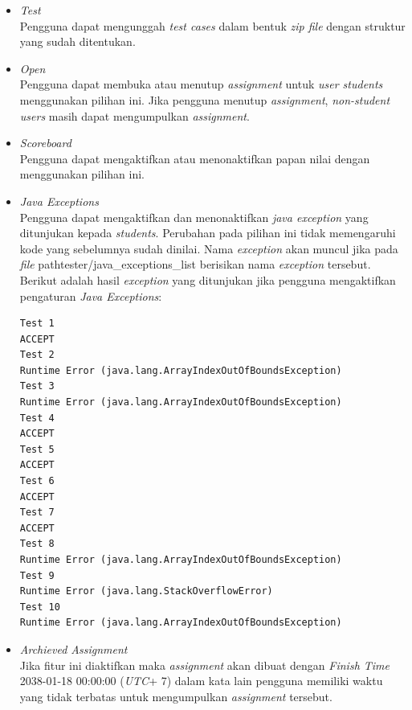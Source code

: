 \documentclass[a4paper,twoside]{article}
\begin{document}
\begin{enumerate}
\begin{itemize}
			\item \textit{Test} \\
			Pengguna dapat mengunggah \textit{test cases} dalam bentuk \textit{zip file} dengan struktur yang sudah ditentukan.
			
			\item \textit{Open} \\
			Pengguna dapat membuka atau menutup \textit{assignment} untuk \textit{user students} menggunakan pilihan ini. Jika pengguna menutup \textit{assignment}, \textit{non-student users} masih dapat mengumpulkan \textit{assignment}.
			
			\item \textit{Scoreboard} \\
			Pengguna dapat mengaktifkan atau menonaktifkan papan nilai dengan menggunakan pilihan ini.
			
			\item \textit{Java Exceptions} \\
			Pengguna dapat mengaktifkan dan menonaktifkan \textit{java exception} yang ditunjukan kepada \textit{students}. Perubahan pada pilihan ini tidak memengaruhi kode yang sebelumnya sudah dinilai. Nama \textit{exception} akan muncul jika pada \textit{file} path{tester/java\_exceptions\_list} berisikan nama \textit{exception} tersebut. Berikut adalah hasil \textit{exception} yang ditunjukan jika pengguna mengaktifkan pengaturan \textit{Java Exceptions}: \\
			
			\begin{lstlisting}[basicstyle=\ttfamily, frame=single,
			columns=fullflexible, keepspaces=true, breaklines=true, label=ls:6]
Test 1
ACCEPT
Test 2
Runtime Error (java.lang.ArrayIndexOutOfBoundsException)
Test 3
Runtime Error (java.lang.ArrayIndexOutOfBoundsException)
Test 4
ACCEPT
Test 5
ACCEPT
Test 6
ACCEPT
Test 7
ACCEPT
Test 8
Runtime Error (java.lang.ArrayIndexOutOfBoundsException)
Test 9
Runtime Error (java.lang.StackOverflowError)
Test 10
Runtime Error (java.lang.ArrayIndexOutOfBoundsException)
			\end{lstlisting}
			
			\item \textit{Archieved Assignment} \\
			Jika fitur ini diaktifkan maka \textit{assignment} akan dibuat dengan \textit{Finish Time} 2038-01-18 00:00:00 (\textit{UTC}+ 7) dalam kata lain pengguna memiliki waktu yang tidak terbatas untuk mengumpulkan \textit{assignment} tersebut.
			

\end{itemize}
\end{enumerate}
\end{document}
